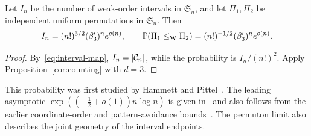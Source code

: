 \documentclass[11pt,letterpaper]{article}
\begin{document}
\begin{proposition}
      Let $I_n$ be the number of weak-order intervals in $\mathfrak S_n$, and let $\Pi_1,\Pi_2$ be independent uniform permutations in $\mathfrak S_n$. Then
      \[
            I_n=(n!)^{3/2}(\beta_3')^n e^{o(n)},\qquad \P(\Pi_1\le_{\rm W}\Pi_2)=(n!)^{-1/2}(\beta_3')^n e^{o(n)}.
      \]
\end{proposition}

\begin{proof}
      By~\eqref{eq:interval-map}, $I_n=|\cC_n|$, while the probability is $I_n/(n!)^2$. Apply Proposition~\ref{cor:counting} with $d=3$.
\end{proof}

This probability was first studied by Hammett and Pittel~\cite{HP}. The leading asymptotic $\exp((-\frac12+o(1))n\log n)$ is given in~\cite[Theorem~1.1]{BCHHLM} and also follows from the earlier coordinate-order and pattern-avoidance bounds~\cite{CK,GP}.
The permuton limit also describes the joint geometry of the interval endpoints.
\end{document}
